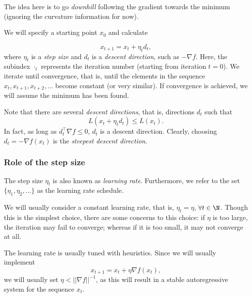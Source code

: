The idea here is to go \emph{downhill} following the gradient towards the minimum (ignoring the curvature information for now). 

We will specify a starting point $x_0$ and calculate

\begin{equation}
	x_{t+1} = x_t + \eta_t d_t,
\end{equation}
where $\eta_t$ is a \emph{step size} and $d_t$ is a \emph{descent direction}, such as $-\nabla f$. Here, the subindex $\cdot_t$ represents the iteration number (starting from iteration $t=0$). We iterate until convergence, that is, until the elements in the sequence $x_t,x_{t+1}, x_{t+2},\ldots$ become constant (or very similar). If convergence is achieved, we will assume the minimum has been found. 

Note that there are several \emph{descent directions}, that is, directions $d_t$ such that 
\begin{equation}
	L( x_t + \eta_t d_t) \leq L(x_t).
\end{equation}
In fact, as long as $d_t^\top\nabla f \leq 0$, $d_t$ is a descent direction. Clearly, choosing $d_t = -\nabla f(x_t)$ is the \emph{steepest descent direction}.


\subsubsection{Role of the step size}
\label{ssub:stepsize}

The step size $\eta_t$ is also known as \emph{learning rate}. Furthermore,  we refer to the set $\{\eta_1,\eta_2,\ldots\}$ as the learning rate schedule.

We will usually consider a constant learning rate, that is, $\eta_t = \eta$, $\forall t\in\N$. Though this is the simplest choice, there are some concerns to this choice: if $\eta$ is too large, the iteration may fail to converge; whereas if it is too small, it may not converge at all. 


\begin{mdframed}[style=ejemplo, frametitle={\center Example: convergence for a parabola}]


\end{mdframed}

The learning rate is usually tuned with heuristics. Since we will usually implement 
\begin{equation}
	x_{t+1} = x_t + \eta \nabla f(x_t),
\end{equation}
we will usually set $\eta<||\nabla f||^{-1}$, as this will result in a stable autoregressive system for the sequence $x_t$. 



